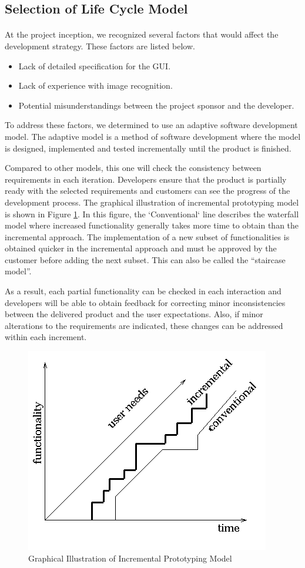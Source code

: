 \subsection{Selection of Life Cycle Model}
\paragraph{} At the project inception, we recognized several factors that would affect the development strategy. These factors are listed below.
\begin{itemize}
\item Lack of detailed specification for the GUI.
\item Lack of experience with image recognition.
\item Potential misunderstandings between the project sponsor and the developer.
\end{itemize}
\par To address these factors, we determined to use an adaptive software development model. The adaptive model is a method of software development where the model is designed, implemented and tested incrementally until the product is finished. 
\par Compared to other models, this one will check the consistency between requirements in each iteration. Developers ensure that the product is partially ready with the selected requirements and customers can see the progress of the development process. The graphical illustration of incremental prototyping model is shown in Figure \ref{IncrmentalModel}. In this figure, the `Conventional` line describes the waterfall model where increased functionality generally takes more time to obtain than the incremental approach. The implementation of a new subset of functionalities is obtained quicker in the incremental approach and must be approved by the customer before adding the next subset. This can also be called  the “staircase model”.

\par As a result, each partial functionality can be checked in each interaction and developers will be able to obtain feedback for correcting minor inconsistencies between the delivered product and the user expectations.  Also, if minor alterations to the requirements are indicated, these changes can be addressed within each increment.

\begin{figure}[htb]
\centering
\includegraphics[width=.5\textwidth]{section02/assets/IncrementalModel.png}
\caption[Graphical Illustration of Incremental Prototyping Model]{\label{IncrmentalModel}Graphical Illustration of Incremental Prototyping Model}
\end{figure}

